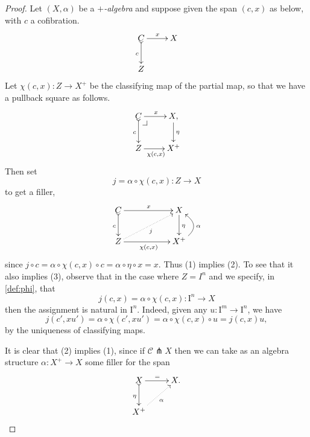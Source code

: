 \documentclass[11pt]{article}
\makeatletter
\newcommand{\pbcorner}[1][dr]{\save*!/#1-1.2pc/#1:(-1,1)@^{|-}\restore}
\newcommand{\I}{\ensuremath{\mathrm{I}}}
\theoremstyle{remark}
\theoremstyle{definition}
\makeatother
\begin{document}
\begin{proof}
Let $(X, \alpha)$ be a \emph{$+$-algebra} and suppose given the span $(c,x)$ as below, with $c$ a cofibration. 
\begin{equation*}%
\xymatrix{
C \ar@{>->}[d]_{c} \ar[r]^{x} & X \\
Z &
}
\end{equation*}
Let $\chi(c,x): Z\to X^+$ be the classifying map of the partial map, so that we have a pullback square as follows.
\begin{equation}\label{diagram:defphi}
\xymatrix{
C \ar@{>->}[d]_{c} \ar[r]^{x} \pbcorner & X \ar[d]^{\eta}, \\
Z \ar[r]_{\chi(c,x)} & X^+
}
\end{equation}
Then set
\begin{equation}\label{def:phi}
j = \alpha\circ\chi(c,x) : Z\to X
\end{equation}
to get a filler,
\begin{equation}\label{diagram:defphi}
\xymatrix{
C \ar@{>->}[d]_{c} \ar[rr]^{x} && X \ar[d]^{\eta} \\
Z\ar@{.>}[rru]_{j} \ar[rr]_{\chi(c,x)} && X^+  \ar@/_4ex/ [u]_\alpha
}
\end{equation}
since $j\circ c = \alpha\circ\chi(c,x)\circ c = \alpha\circ\eta \circ x = x$. Thus (1) implies (2).  To see that it also implies (3), observe that in the case where $Z=I^n$ and we specify, in \eqref{def:phi}, that
\begin{equation}\label{def:j}
j(c,x) = \alpha\circ\chi(c,x) : \I^n\to X
\end{equation}
then the assignment is natural in $\I^n$. Indeed,  given any $u : \I^m \to \I^n$, we have
\begin{equation}\label{eq:proof,uniformfillers}
j(c',xu') = \alpha\circ\chi(c',xu') = \alpha\circ\chi(c,x)\circ u = j(c,x) u,
\end{equation}
by the uniqueness of classifying maps.

It is clear that (2) implies (1), since if $\mathcal{C} \pitchfork X$ then we can take as an algebra structure $\alpha : X^+ \to X$ some filler for the span
\[
\xymatrix{
X \ar@{>->}[d]_{\eta} \ar[r]^{=} & X .\\
X^+ \ar@{.>}[ru]_\alpha&
}
\]


\end{proof}
\end{document}
